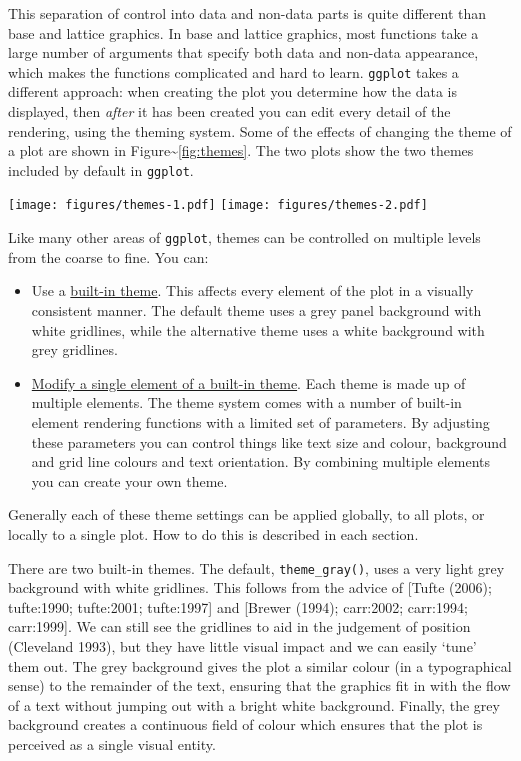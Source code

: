 This separation of control into data and non-data parts is quite
different than base and lattice graphics. In base and lattice graphics,
most functions take a large number of arguments that specify both data
and non-data appearance, which makes the functions complicated and hard
to learn. \texttt{ggplot} takes a different approach: when creating the
plot you determine how the data is displayed, then \emph{after} it has
been created you can edit every detail of the rendering, using the
theming system. Some of the effects of changing the theme of a plot are
shown in Figure\textasciitilde{}\ref{fig:themes}. The two plots show the
two themes included by default in \texttt{ggplot}.

\texttt{[image: figures/themes-1.pdf]}
\texttt{[image: figures/themes-2.pdf]}

Like many other areas of \texttt{ggplot}, themes can be controlled on
multiple levels from the coarse to fine. You can:

\begin{itemize}
\itemsep1pt\parskip0pt
\item
  Use a \hyperref[sec:built-in]{built-in theme}. This affects every
  element of the plot in a visually consistent manner. The default theme
  uses a grey panel background with white gridlines, while the
  alternative theme uses a white background with grey gridlines.
\item
  \hyperref[sec:theme-elements]{Modify a single element of a built-in
  theme}. Each theme is made up of multiple elements. The theme system
  comes with a number of built-in element rendering functions with a
  limited set of parameters. By adjusting these parameters you can
  control things like text size and colour, background and grid line
  colours and text orientation. By combining multiple elements you can
  create your own theme. 
\end{itemize}

\noindent Generally each of these theme settings can be applied
globally, to all plots, or locally to a single plot. How to do this is
described in each section.


There are two built-in themes.  The default,
\texttt{theme\_gray()}, uses a very light grey background with white
gridlines. This follows from the advice of {[}Tufte (2006); tufte:1990;
tufte:2001; tufte:1997{]} and {[}Brewer (1994); carr:2002; carr:1994;
carr:1999{]}. We can still see the gridlines to aid in the judgement of
position (Cleveland 1993), but they have little visual impact and we can
easily `tune' them out. The grey background gives the plot a similar
colour (in a typographical sense) to the remainder of the text, ensuring
that the graphics fit in with the flow of a text without jumping out
with a bright white background. Finally, the grey background creates a
continuous field of colour which ensures that the plot is perceived as a
single visual entity. 

